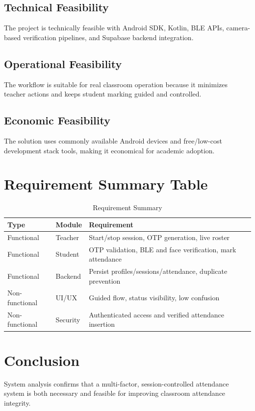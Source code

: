 \subsection{Technical Feasibility}
The project is technically feasible with Android SDK, Kotlin, BLE APIs, camera-based verification pipelines, and Supabase backend integration.

\subsection{Operational Feasibility}
The workflow is suitable for real classroom operation because it minimizes teacher actions and keeps student marking guided and controlled.

\subsection{Economic Feasibility}
The solution uses commonly available Android devices and free/low-cost development stack tools, making it economical for academic adoption.

\section{Requirement Summary Table}
\begin{table}[H]
\centering
\caption{Requirement Summary}
\label{c3:tab1}
\begin{tabular}{|L{3cm}|L{3.5cm}|L{5.5cm}|}
\hline
\textbf{Type} & \textbf{Module} & \textbf{Requirement}\\
\hline
Functional & Teacher & Start/stop session, OTP generation, live roster\\
\hline
Functional & Student & OTP validation, BLE and face verification, mark attendance\\
\hline
Functional & Backend & Persist profiles/sessions/attendance, duplicate prevention\\
\hline
Non-functional & UI/UX & Guided flow, status visibility, low confusion\\
\hline
Non-functional & Security & Authenticated access and verified attendance insertion\\
\hline
\end{tabular}
\end{table}

\section{Conclusion}
System analysis confirms that a multi-factor, session-controlled attendance system is both necessary and feasible for improving classroom attendance integrity.

